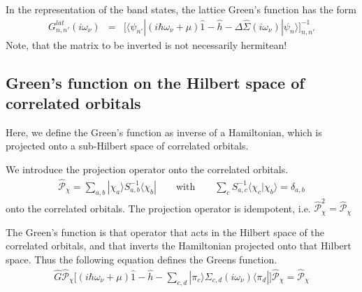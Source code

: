 \documentclass[11pt,a4paper]{report}
\begin{document}
In the representation of the band states, the lattice Green's function
has the form
\begin{eqnarray}
G^{lat}_{n,n'}(i\omega_\nu)&=&
\biggl[\langle\psi_{n'}|(i\hbar\omega_\nu+\mu)\hat{1}-\hat{h}
-\Delta\hat{\Sigma}(i\omega_\nu)|\psi_n\rangle\biggr]_{n,n'}^{-1}
\label{eq:latgreenfuncmat}
\end{eqnarray}
Note, that the matrix to be inverted is not necessarily hermitean!


\subsection{Green's function on the Hilbert space of correlated orbitals}
Here, we define the Green's function as inverse of a Hamiltonian,
which is projected onto a sub-Hilbert space of correlated
orbitals. 

We introduce the projection operator onto the correlated orbitals.
\begin{eqnarray}
\hat{\mathcal{P}}_\chi=\sum_{a,b}|\chi_a\rangle S^{-1}_{a,b}\langle\chi_b|
\qquad\text{with}\qquad \sum_c S^{-1}_{a,c}\langle\chi_c|\chi_b\rangle=\delta_{a,b}
\end{eqnarray}
onto the correlated orbitals. The projection operator is idempotent,
i.e. $\hat{\mathcal{P}}_\chi^2=\hat{\mathcal{P}}_\chi$

The Green's function is that operator that acts in the Hilbert space
of the correlated orbitals, and that inverts the Hamiltonian projected
onto that Hilbert space. Thus the following equation defines the
Greens function.
\begin{eqnarray}
\hat{G}\hat{\mathcal{P}}_\chi
\biggl[(i\hbar\omega_\nu+\mu)\hat{1}-\hat{h}-\sum_{c,d}|\pi_c\rangle\Sigma_{c,d}(i\omega_\nu)\langle\pi_d|\biggr]
\hat{\mathcal{P}}_\chi=\hat{\mathcal{P}}_\chi
\end{eqnarray}
\end{document}
